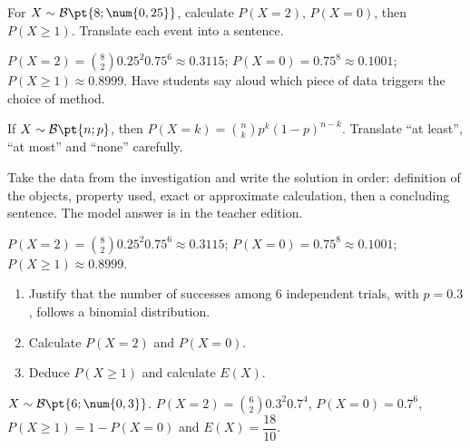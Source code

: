 \begin{activity}
For $X\sim\mathcal B\pt{8;\num{0,25}}$, calculate $P(X=2)$, $P(X=0)$, then $P(X\geq1)$. Translate each event into a sentence.
\begin{center}\end{center}
\end{activity}
\begin{solution}$P(X=2)=\binom82 \num{0,25}^2 \num{0,75}^6\approx\num{0,3115}$; $P(X=0)=\num{0,75}^8\approx\num{0,1001}$; $P(X\geq1)\approx\num{0,8999}$. Have students say aloud which piece of data triggers the choice of method.\end{solution}

\begin{summary}If $X\sim\mathcal B\pt{n;p}$, then $P(X=k)=\binom nkp^k(1-p)^{n-k}$. Translate ``at least'', ``at most'' and ``none'' carefully.\end{summary}

\begin{example}
Take the data from the investigation and write the solution in order: definition of the objects, property used, exact or approximate calculation, then a concluding sentence. The model answer is in the teacher edition.
\end{example}
\begin{solution}$P(X=2)=\binom82 \num{0,25}^2 \num{0,75}^6\approx\num{0,3115}$; $P(X=0)=\num{0,75}^8\approx\num{0,1001}$; $P(X\geq1)\approx\num{0,8999}$.\end{solution}

\begin{exercise}[essential]
\begin{enumerate}\item Justify that the number of successes among $6$ independent trials, with $p=\num{0,3}$, follows a binomial distribution.\item Calculate $P(X=2)$ and $P(X=0)$.\item Deduce $P(X\geq1)$ and calculate $E(X)$.\end{enumerate}
\end{exercise}
\begin{solution}$X\sim\mathcal B\pt{6;\num{0,3}}$. $P(X=2)=\binom{6}2 \num{0,3}^2 \num{0,7}^{4}$, $P(X=0)=\num{0,7}^{6}$, $P(X\geq1)=1-P(X=0)$ and $E(X)=\dfrac{18}{10}$.\end{solution}

